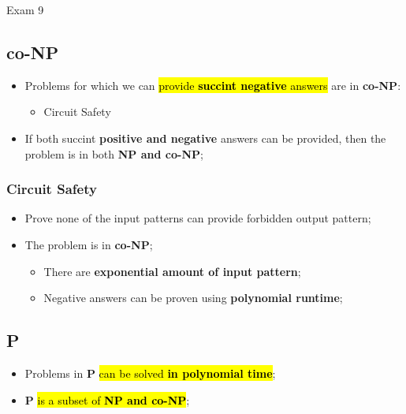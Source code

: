 \documentclass{note}
\begin{document}
\begin{note}{Exam 9}
    \subsection{co-NP}

    \begin{itemize}
        \item Problems for which we can \hl{provide \textbf{succint negative} answers} are in \textbf{co-NP}:
        \begin{itemize}
            \item Circuit Safety
        \end{itemize}

        \item If both succint \textbf{positive and negative} answers can be provided, then the problem is in both \textbf{NP and co-NP};
    \end{itemize}

        \subsubsection{Circuit Safety}

        \begin{itemize}
            \item Prove none of the input patterns can provide forbidden output pattern;
            \item The problem is in \textbf{co-NP};
            \begin{itemize}
                \item There are \textbf{exponential amount of input pattern};
                \item Negative answers can be proven using \textbf{polynomial runtime};
            \end{itemize}
        \end{itemize}


    \subsection{P}

    \begin{itemize}
        \item Problems in \textbf{P} \hl{can be solved \textbf{in polynomial time}};
        \item \textbf{P} \hl{is a subset of \textbf{NP and co-NP}};
    \end{itemize}

\end{note}
\end{document}
